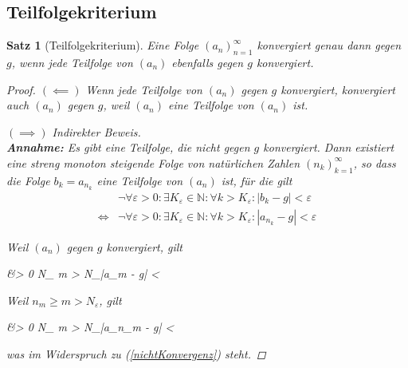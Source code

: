 \documentclass{article}
\newtheorem{thm}{Satz}[section]
\newenvironment{aleq}{
\begin{equation}
\begin{aligned}
}{
\end{aligned}
\end{equation}
}
\newenvironment{aleq*}{\begin{equation*}\begin{aligned}}{\end{aligned}\end{equation*}}
\begin{document}
	\subsection{Teilfolgekriterium}
	\begin{thm}[Teilfolgekriterium]
		Eine Folge \((a_n)_{n=1}^\infty\) konvergiert genau dann gegen \(g\), wenn jede Teilfolge von \((a_n)\) ebenfalls gegen \(g\) konvergiert.
		\begin{proof}
			\((\impliedby)\) Wenn jede Teilfolge von \((a_n)\) gegen \(g\) konvergiert, konvergiert auch \((a_n)\) gegen \(g\), weil \((a_n)\) eine Teilfolge von \((a_n)\) ist. \\
			\par
			\((\implies)\) Indirekter Beweis. \\
				\textbf{Annahme: } Es gibt eine Teilfolge, die nicht gegen \(g\) konvergiert. Dann existiert  eine streng monoton steigende Folge von natürlichen Zahlen \((n_k)_{k=1}^\infty\), so dass die Folge \(b_k = a_{n_k}\) eine Teilfolge von \((a_n)\) ist, für die gilt
			\begin{aleq}
				\label{nichtKonvergenz}
				&\lnot \forall \varepsilon > 0 \colon \exists K_\varepsilon \in \mathbb{N} \colon \forall k > K_\varepsilon \colon |b_k -g| < \varepsilon \\
				\iff &\lnot \forall \varepsilon > 0 \colon \exists K_\varepsilon \in \mathbb{N} \colon \forall k > K_\varepsilon \colon |a_{n_k} -g| < \varepsilon
			\end{aleq}
			\par
			Weil \((a_n)\) gegen \(g\) konvergiert, gilt
			\begin{aleq*}
				&\forall \varepsilon > 0 \colon \exists N_\varepsilon \in {} \colon \forall m > N_\varepsilon \colon |a_m - g| < \varepsilon {}
			\end{aleq*}
			\par
			Weil \(n_m \geq m > N_\varepsilon\), gilt
			\begin{aleq*}
				&\forall \varepsilon > 0 \colon \exists N_\varepsilon \in {} \colon \forall m > N_\varepsilon \colon |a_{n_m} - g| < \varepsilon \text{,}
			\end{aleq*}
			\par
			was im Widerspruch zu (\ref{nichtKonvergenz}) steht.
 		\end{proof}
	\end{thm}
	
\end{document}
